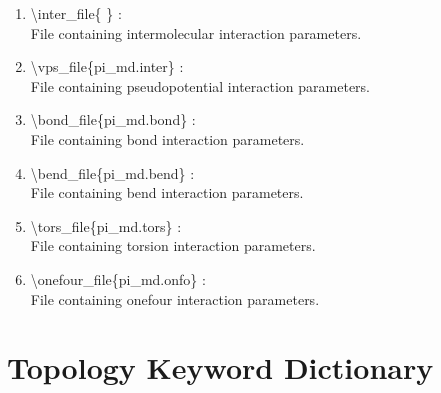 \documentclass[12pt,titlepage]{article}
\begin{document}
\begin{enumerate}

 \vspace{0.15in} 
 \item  \textbackslash{}inter\_file\{ \} : \\
    File containing intermolecular interaction parameters.

 \vspace{0.15in} 
 \item  \textbackslash{}vps\_file\{pi\_md.inter\} : \\
    File containing pseudopotential interaction parameters.

 \vspace{0.15in} 
 \item  \textbackslash{}bond\_file\{pi\_md.bond\} : \\
    File containing bond interaction parameters.

 \vspace{0.15in} 
 \item  \textbackslash{}bend\_file\{pi\_md.bend\} : \\
    File containing bend interaction parameters.

 \vspace{0.15in} 
 \item  \textbackslash{}tors\_file\{pi\_md.tors\} : \\
    File containing torsion interaction parameters.

 \vspace{0.15in} 
 \item  \textbackslash{}onefour\_file\{pi\_md.onfo\} : \\
    File containing onefour interaction parameters.

\end{enumerate}

\newpage


\section{\bf Topology Keyword Dictionary} 
\end{document}
